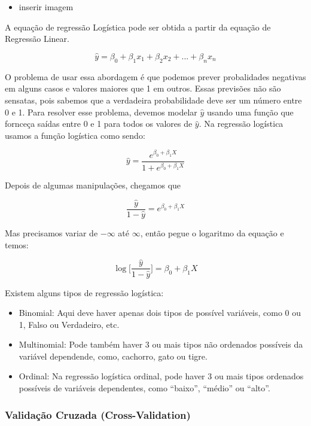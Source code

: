 \documentclass[
  letterpaper,
  DIV=11,
  numbers=noendperiod]{scrreprt}
\providecommand{\tightlist}{%
  \setlength{\itemsep}{0pt}\setlength{\parskip}{0pt}}\usepackage{longtable,booktabs,array}
\begin{document}
\begin{itemize}
\tightlist
\item
  inserir imagem
\end{itemize}

A equação de regressão Logística pode ser obtida a partir da equação de
Regressão Linear.

\[
\hat y = \beta_0 + \beta_1x_1 + \beta_2x_2 + ...+ \beta_nx_n
\]

O problema de usar essa abordagem é que podemos prever probalidades
negativas em alguns casos e valores maiores que 1 em outros. Essas
previsões não são sensatas, pois sabemos que a verdadeira probabilidade
deve ser um número entre 0 e 1. Para resolver esse problema, devemos
modelar \(\hat y\) usando uma função que fornceça saídas entre 0 e 1
para todos os valores de \(\hat y\). Na regressão logística usamos a
função logística como sendo:

\[
\hat y = \frac{e^{\beta_0+\beta_1X}}{1 + e^{\beta_0+\beta_1X}}
\]

Depois de algumas manipulações, chegamos que

\[
\frac{\hat y}{1- \hat y} = e^{\beta_0+\beta_1X}
\]

Mas precisamos variar de \(-\infty\) até \(\infty\), então pegue o
logaritmo da equação e temos:

\[
\log\bigg[\frac{\hat y}{1- \hat y} \bigg ] = {\beta_0+\beta_1X}
\]

Existem alguns tipos de regressão logística:

\begin{itemize}
\item
  Binomial: Aqui deve haver apenas dois tipos de possível variáveis,
  como 0 ou 1, Falso ou Verdadeiro, etc.
\item
  Multinomial: Pode também haver 3 ou mais tipos não ordenados possíveis
  da variável dependende, como, cachorro, gato ou tigre.
\item
  Ordinal: Na regressão logística ordinal, pode haver 3 ou mais tipos
  ordenados possíveis de variáveis \hspace{0pt}\hspace{0pt}dependentes,
  como ``baixo'', ``médio'' ou ``alto''.
\end{itemize}

\hypertarget{validauxe7uxe3o-cruzada-cross-validation}{%
\subsubsection{Validação Cruzada
(Cross-Validation)}\label{validauxe7uxe3o-cruzada-cross-validation}}
\end{document}
